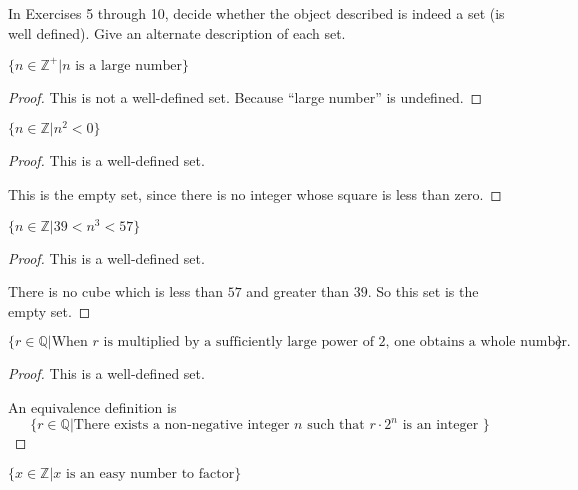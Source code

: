 In Exercises 5 through 10, decide whether the object described is indeed a set (is well defined). Give an alternate description of each set.

\begin{exercise}
    $\{ n\in\mathbb{Z}^{+} \vert \text{$n$ is a large number} \}$
\end{exercise}

\begin{proof}
    This is not a well-defined set. Because ``large number'' is undefined.
\end{proof}

\begin{exercise}
    $\{ n\in\mathbb{Z} \vert n^{2} < 0 \}$
\end{exercise}

\begin{proof}
    This is a well-defined set.

    This is the empty set, since there is no integer whose square is less than zero.
\end{proof}

\begin{exercise}
    $\{ n\in\mathbb{Z} \vert 39 < n^{3} < 57 \}$
\end{exercise}

\begin{proof}
    This is a well-defined set.

    There is no cube which is less than $57$ and greater than $39$. So this set is the empty set.
\end{proof}

\begin{exercise}
    $\{ r\in\mathbb{Q} \vert \text{When $r$ is multiplied by a sufficiently large power of $2$, one obtains a whole number.} \}$
\end{exercise}

\begin{proof}
    This is a well-defined set.

    An equivalence definition is
    \[
        \{ r\in\mathbb{Q} \vert \text{There exists a non-negative integer $n$ such that $r\cdot 2^{n}$ is an integer } \}
    \]
\end{proof}

\begin{exercise}
    $\{ x\in\mathbb{Z} \vert \text{$x$ is an easy number to factor} \}$
\end{exercise}

